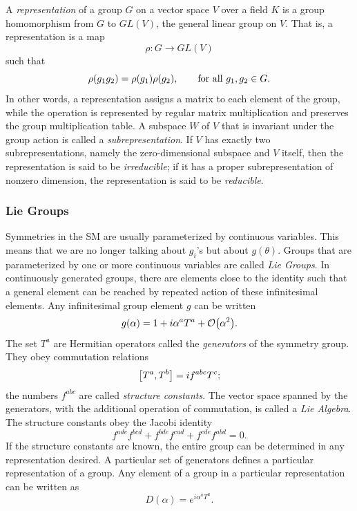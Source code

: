 A \emph{representation} of a group $G$ on a vector space $V$ over a field $K$ is a group homomorphism from $G$ to $GL(V)$, the general linear group on $V$. That is, a representation is a map
\begin{equation}
\rho:G\rightarrow GL(V)
\end{equation}
such that
\begin{equation}
\rho\qty(g_1 g_2)=\rho\qty(g_1)\rho\qty(g_2),\qquad \textrm{for all}\,\, g_1,g_2\in G.
\end{equation}
In other words, a representation assigns a matrix to each element of the group, while the operation is represented by regular matrix multiplication and preserves the group multiplication table. A subspace $W$ of $V$ that is invariant under the group action is called a \emph{subrepresentation}. If $V$ has exactly two subrepresentations, namely the zero-dimensional subspace and $V$ itself, then the representation is said to be \emph{irreducible}; if it has a proper subrepresentation of nonzero dimension, the representation is said to be \emph{reducible}. 

\subsubsection{Lie Groups}

Symmetries in the SM are usually parameterized by continuous variables. This means that we are no longer talking about $g_i$'s but about $g(\theta)$. Groups that are parameterized by one or more continuous variables are called \emph{Lie Groups}. In continuously generated groups, there are elements close to the identity such that a general element can be reached by repeated action of these infinitesimal elements. Any infinitesimal group element $g$ can be written
\begin{equation}
g\qty(\alpha)=1+i\alpha^aT^a+\order{\alpha^2}.
\end{equation}
The set $T^a$ are Hermitian operators called the \emph{generators} of the symmetry group. They obey commutation relations
\begin{equation}
\comm{T^a}{T^b}=i f^{abc}T^c;
\end{equation}
the numbers $f^{abc}$ are called \emph{structure constants}. The vector space spanned by the generators, with the additional operation of commutation, is called a \emph{Lie Algebra}. The structure constants obey the Jacobi identity
\begin{equation}
f^{ade}f^{bcd}+f^{bde}f^{cad}+f^{cde}f^{abd}=0.
\end{equation}
If the structure constants are known, the entire group can be determined in any representation desired. A particular set of generators defines a particular representation of a group. Any element of a group in a particular representation can be written as
\begin{equation}
D(\alpha)=e^{i\alpha^{a}T^{a}}.
\end{equation}

